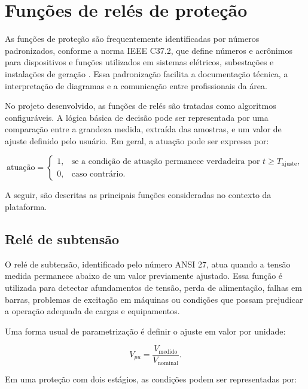 \section{Funções de relés de proteção}

As funções de proteção são frequentemente identificadas por números padronizados, conforme a norma IEEE C37.2, que define números e acrônimos para dispositivos e funções utilizados em sistemas elétricos, subestações e instalações de geração \cite{ieee_c37_2_2022}. Essa padronização facilita a documentação técnica, a interpretação de diagramas e a comunicação entre profissionais da área.

No projeto desenvolvido, as funções de relés são tratadas como algoritmos configuráveis. A lógica básica de decisão pode ser representada por uma comparação entre a grandeza medida, extraída das amostras, e um valor de ajuste definido pelo usuário. Em geral, a atuação pode ser expressa por:

\begin{equation}
  \text{atuação} =
  \begin{cases}
    1, & \text{se a condição de atuação permanece verdadeira por } t \geq T_{\text{ajuste}},\\
    0, & \text{caso contrário}.
  \end{cases}
  \label{eq:trip-generico}
\end{equation}

\noindent A seguir, são descritas as principais funções consideradas no contexto da plataforma.

\subsection{Relé de subtensão}

O relé de subtensão, identificado pelo número ANSI 27, atua quando a tensão medida permanece abaixo de um valor previamente ajustado. Essa função é utilizada para detectar afundamentos de tensão, perda de alimentação, falhas em barras, problemas de excitação em máquinas ou condições que possam prejudicar a operação adequada de cargas e equipamentos.

Uma forma usual de parametrização é definir o ajuste em valor por unidade:

\begin{equation}
  V_{pu} = \frac{V_{\text{medido}}}{V_{\text{nominal}}}.
  \label{eq:vpu}
\end{equation}

\noindent Em uma proteção com dois estágios, as condições podem ser representadas por:

